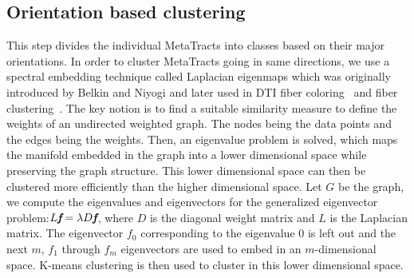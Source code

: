 \subsection {Orientation based clustering}
This step divides the individual MetaTracts into classes based on their major orientations. In order to cluster MetaTracts going in same directions, we use a spectral embedding technique called Laplacian eigenmaps which was originally introduced by Belkin and Niyogi \cite{Belkin01} and later used in DTI fiber coloring~\cite{Brun2003} and fiber clustering~\cite{Brun2004}. The key notion is to find a suitable similarity measure to define the weights of an undirected weighted graph. The nodes being the data points and the edges being the weights. Then, an eigenvalue problem is solved, which maps the manifold embedded in the graph into a lower dimensional space while preserving the graph structure.
This lower dimensional space can then be clustered more efficiently than the higher dimensional space. 
Let $G$ be the graph, we compute the eigenvalues and eigenvectors for the generalized eigenvector problem:$L\textit{\textbf{f}}=\lambda D\textit{\textbf{f}}$,
where $D$ is the diagonal weight matrix and $L$ is the Laplacian matrix. The eigenvector \textbf{${f}_{0}$} corresponding to the eigenvalue 0 is left out and the next $m$, {\textbf{${f}_{1}$} through \textbf{${f}_{m}$}} eigenvectors are used to embed in an $m$-dimensional space. K-means clustering is then used to cluster in this lower dimensional space.

